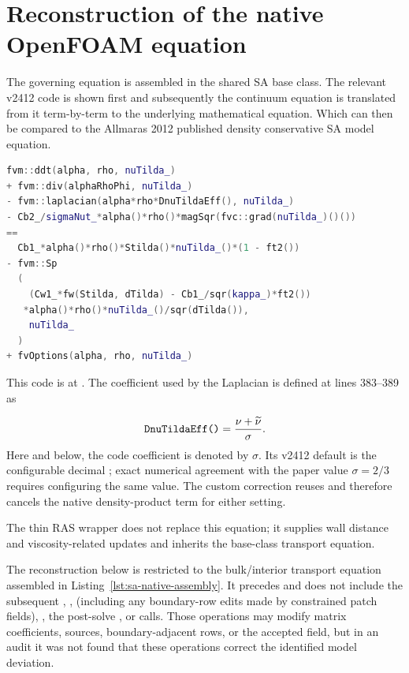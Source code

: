 \section{Reconstruction of the native OpenFOAM equation}
\label{sec:sa-native-reconstruction}

The governing equation is assembled in the shared SA base class.  The relevant
\SAOF{} v2412 code is shown first and subsequently the continuum equation is translated from it term-by-term to the underlying mathematical equation. Which can then be compared to the Allmaras 2012 published density conservative SA model equation. 
\begin{lstlisting}[style=SAFoam,language=C++,firstnumber=468,
  caption={Native SA equation assembly in SpalartAllmarasBase.C.},
  label={lst:sa-native-assembly}]
fvm::ddt(alpha, rho, nuTilda_)
+ fvm::div(alphaRhoPhi, nuTilda_)
- fvm::laplacian(alpha*rho*DnuTildaEff(), nuTilda_)
- Cb2_/sigmaNut_*alpha()*rho()*magSqr(fvc::grad(nuTilda_)()())
==
  Cb1_*alpha()*rho()*Stilda()*nuTilda_()*(1 - ft2())
- fvm::Sp
  (
    (Cw1_*fw(Stilda, dTilda) - Cb1_/sqr(kappa_)*ft2())
   *alpha()*rho()*nuTilda_()/sqr(dTilda()),
    nuTilda_
  )
+ fvOptions(alpha, rho, nuTilda_)
\end{lstlisting}
This code is at
.  The coefficient used by the
Laplacian is defined at lines 383--389 as\par
\begin{equation}
  \texttt{DnuTildaEff()}
  =\frac{\nu+\widetilde{\nu}}{\sigma}.
  \label{eq:sa-effective-diffusivity}
\end{equation}
Here and below, the code coefficient  is denoted by
\(\sigma\).  Its v2412 default is the configurable decimal
; exact numerical agreement with the paper value
\(\sigma=2/3\) requires configuring the same value.  The custom correction
reuses  and therefore cancels the native density-product
term for either setting.

The thin RAS wrapper does not replace this equation; it supplies wall distance
and viscosity-related updates and inherits the base-class transport equation.

The reconstruction below is restricted to the bulk/interior transport
equation assembled in Listing~\ref{lst:sa-native-assembly}.  It precedes and
does not include the subsequent ,
,  (including any
boundary-row edits made by constrained patch fields), , the
post-solve , or
 calls.  Those operations may
modify matrix coefficients, sources, boundary-adjacent rows, or the accepted
field, but in an audit it was not found that these operations correct the identified model deviation.

